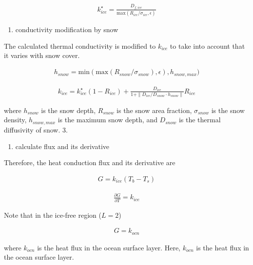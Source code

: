 \begin{eqnarray}
k_{ice}^\star = \frac{D_{f,ice}}{\mathrm{max}(R_{ice}/\sigma_{ice}, \epsilon)}
\end{eqnarray}

\begin{enumerate}
\def\labelenumi{\arabic{enumi}.}
\setcounter{enumi}{1}
\tightlist
\item
  conductivity modification by snow
\end{enumerate}

The calculated thermal conductivity is modified to \(k_{ice}\) to take
into account that it varies with snow cover.

\begin{eqnarray}
h_{snow} = \mathrm{min}(
    \mathrm{max}(
    R_{snow}/\sigma_{snow}),\epsilon
        ),h_{snow,max}
        )
\end{eqnarray}

\begin{eqnarray}      
k_{ice} = k_{ice}^\star (1-R_{ice}) + \frac{D_{ice}}{1+\| D_{ice}/D_{snow} \cdot h_{snow} \|} R_{ice}
\end{eqnarray}

where \(h_{snow}\) is the snow depth, \(R_{snow}\) is the snow area
fraction, \(\sigma_{snow}\) is the snow density, \(h_{snow,max}\) is the
maximum snow depth, and \(D_{snow}\) is the thermal diffusivity of snow.
3.

\begin{enumerate}
\def\labelenumi{\arabic{enumi}.}
\setcounter{enumi}{2}
\tightlist
\item
  calculate flux and its derivative
\end{enumerate}

Therefore, the heat conduction flux and its derivative are

\begin{eqnarray}
 G = k_{ice} (T_b - T_s)
\end{eqnarray}

\begin{eqnarray}
 \frac{\partial G}{\partial T} = k_{ice}
\end{eqnarray}

Note that in the ice-free region (\(L=2\))

\begin{eqnarray}
G=k_{ocn}
\end{eqnarray}

where \(k_{ocn}\) is the heat flux in the ocean surface layer. Here,
\(k_{ocn}\) is the heat flux in the ocean surface layer.

